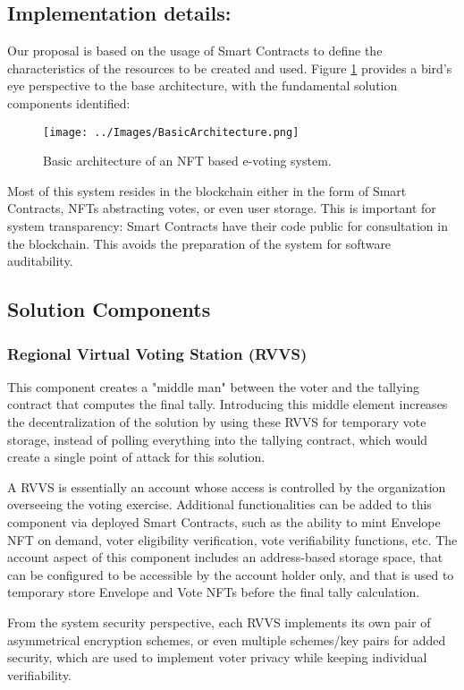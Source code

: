 \subsection{Implementation details:}
Our proposal is based on the usage of Smart Contracts to define the characteristics of the resources to be created and used. Figure \ref{fig:basic_architecture} provides a bird's eye perspective to the base architecture, with the fundamental solution components identified:

\begin{figure}[htp]
    \centering
    \texttt{[image: ../Images/BasicArchitecture.png]}
    \caption{Basic architecture of an NFT based e-voting system.}
    \label{fig:basic_architecture}
\end{figure}

Most of this system resides in the blockchain either in the form of Smart Contracts, NFTs abstracting votes, or even user storage. This is important for system transparency: Smart Contracts have their code public for consultation in the blockchain. This avoids the preparation of the system for software auditability.

\subsection{Solution Components}
\subsubsection{Regional Virtual Voting Station (RVVS)}
\label{regional_virtual_voting_stations}
This component creates a "middle man" between the voter and the tallying contract that computes the final tally. Introducing this middle element increases the decentralization of the solution by using these RVVS for temporary vote storage, instead of polling everything into the tallying contract, which would create a single point of attack for this solution.
\par
A RVVS is essentially an account whose access is controlled by the organization overseeing the voting exercise. Additional functionalities can be added to this component via deployed Smart Contracts, such as the ability to mint Envelope NFT on demand, voter eligibility verification, vote verifiability functions, etc. The account aspect of this component includes an address-based storage space, that can be configured to be accessible by the account holder only, and that is used to temporary store Envelope and Vote NFTs before the final tally calculation.
\par
From the system security perspective, each RVVS implements its own pair of asymmetrical encryption schemes, or even multiple schemes/key pairs for added security, which are used to implement voter privacy while keeping individual verifiability.

